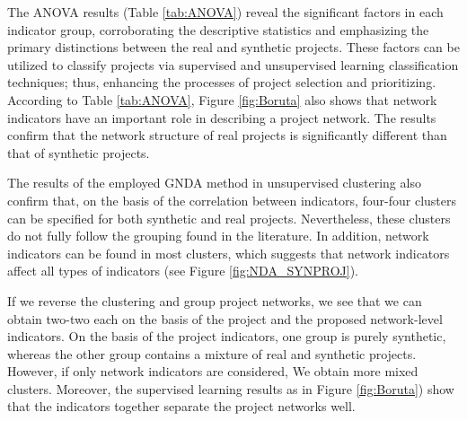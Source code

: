 \documentclass[preprint,
3p]{elsarticle} %
\begin{document}
The ANOVA results (Table \ref{tab:ANOVA}) reveal the significant factors
in each indicator group, corroborating the descriptive statistics and
emphasizing the primary distinctions between the real and synthetic
projects. These factors can be utilized to classify projects via
supervised and unsupervised learning classification techniques; thus,
enhancing the processes of project selection and prioritizing. According
to Table \ref{tab:ANOVA}, Figure \ref{fig:Boruta} also shows that
network indicators have an important role in describing a project
network. The results confirm that the network structure of real projects
is significantly different than that of synthetic projects.

The results of the employed GNDA method in unsupervised clustering also
confirm that, on the basis of the correlation between indicators,
four-four clusters can be specified for both synthetic and real
projects. Nevertheless, these clusters do not fully follow the grouping
found in the literature. In addition, network indicators can be found in
most clusters, which suggests that network indicators affect all types
of indicators (see Figure \ref{fig:NDA_SYNPROJ}).

If we reverse the clustering and group project networks, we see that we
can obtain two-two each on the basis of the project and the proposed
network-level indicators. On the basis of the project indicators, one
group is purely synthetic, whereas the other group contains a mixture of
real and synthetic projects. However, if only network indicators are
considered, We obtain more mixed clusters. Moreover, the supervised
learning results as in Figure \ref{fig:Boruta}) show that the indicators
together separate the project networks well.
\end{document}

